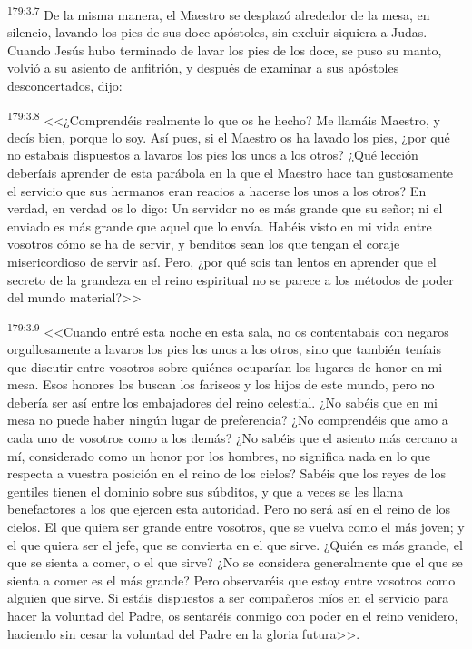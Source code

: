 \par 
\textsuperscript{179:3.7} De la misma manera, el Maestro se desplazó alrededor de la mesa, en silencio, lavando los pies de sus doce apóstoles, sin excluir siquiera a Judas. Cuando Jesús hubo terminado de lavar los pies de los doce, se puso su manto, volvió a su asiento de anfitrión, y después de examinar a sus apóstoles desconcertados, dijo:

\par 
\textsuperscript{179:3.8} <<¿Comprendéis realmente lo que os he hecho? Me llamáis Maestro, y decís bien, porque lo soy. Así pues, si el Maestro os ha lavado los pies, ¿por qué no estabais dispuestos a lavaros los pies los unos a los otros? ¿Qué lección deberíais aprender de esta parábola en la que el Maestro hace tan gustosamente el servicio que sus hermanos eran reacios a hacerse los unos a los otros? En verdad, en verdad os lo digo: Un servidor no es más grande que su señor; ni el enviado es más grande que aquel que lo envía. Habéis visto en mi vida entre vosotros cómo se ha de servir, y benditos sean los que tengan el coraje misericordioso de servir así. Pero, ¿por qué sois tan lentos en aprender que el secreto de la grandeza en el reino espiritual no se parece a los métodos de poder del mundo material?>>

\par 
\textsuperscript{179:3.9} <<Cuando entré esta noche en esta sala, no os contentabais con negaros orgullosamente a lavaros los pies los unos a los otros, sino que también teníais que discutir entre vosotros sobre quiénes ocuparían los lugares de honor en mi mesa. Esos honores los buscan los fariseos y los hijos de este mundo, pero no debería ser así entre los embajadores del reino celestial. ¿No sabéis que en mi mesa no puede haber ningún lugar de preferencia? ¿No comprendéis que amo a cada uno de vosotros como a los demás? ¿No sabéis que el asiento más cercano a mí, considerado como un honor por los hombres, no significa nada en lo que respecta a vuestra posición en el reino de los cielos? Sabéis que los reyes de los gentiles tienen el dominio sobre sus súbditos, y que a veces se les llama benefactores a los que ejercen esta autoridad. Pero no será así en el reino de los cielos. El que quiera ser grande entre vosotros, que se vuelva como el más joven; y el que quiera ser el jefe, que se convierta en el que sirve. ¿Quién es más grande, el que se sienta a comer, o el que sirve? ¿No se considera generalmente que el que se sienta a comer es el más grande? Pero observaréis que estoy entre vosotros como alguien que sirve. Si estáis dispuestos a ser compañeros míos en el servicio para hacer la voluntad del Padre, os sentaréis conmigo con poder en el reino venidero, haciendo sin cesar la voluntad del Padre en la gloria futura>>.

